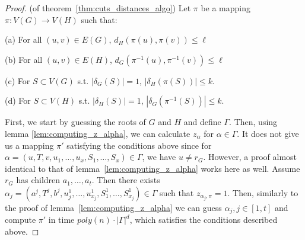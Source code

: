 \begin{proof}(of theorem~\ref{thm:cuts_distances_algo}) Let $\pi$ be a mapping
  $\pi: V(G) \rightarrow V(H)$ such that:

  (a) For all $(u,v) \in E(G)$, $d_H(\pi(u),\pi(v)) \leq \ell$
  
  (b) For all $(u,v) \in E(H)$,
    $d_G(\pi^{-1}(u),\pi^{-1}(v)) \leq \ell$
  
  (c) For $S \subset V(G)$ s.t. $|\delta_G(S)| = 1$,
    $|\delta_H(\pi(S))| \leq k$.
  
  (d) For $S \subset V(H)$ s.t. $|\delta_H(S)| = 1$,
    $|\delta_G(\pi^{-1}(S))| \leq k$.

  First, we start by guessing the roots of $G$ and $H$ and define
  $\Gamma$. Then, using  lemma \ref{lem:computing_z_alpha}, we can calculate
  $z_{\alpha}$ for $\alpha \in \Gamma$. It does not give us a mapping
  $\pi'$ satisfying the conditions above since for
  $\alpha = (u,T,v,u_1,\dots,u_x,S_1,\dots,S_x) \in \Gamma$, we have
  $u \neq r_G$. However, a proof almost identical to that of
  lemma~\ref{lem:computing_z_alpha} works here as well. Assume $r_G$ has
  children $a_1,\dots,a_t$. Then there exists
  $\alpha_j = (a^j,T^j,b^j,u_j^1,\dots,u_{x_j}^1,
  S_1^1,\dots,S_{x_j}^1)\in \Gamma$ such that $z_{\alpha_j,\pi} =
  1$. Then, similarly to the proof of lemma~\ref{lem:computing_z_alpha} we
  can guess $\alpha_j,j \in [1,t]$ and compute $\pi'$ in time
  $poly(n)\cdot |\Gamma|^d$, which satisfies the conditions described
  above.
\end{proof}


%
%

